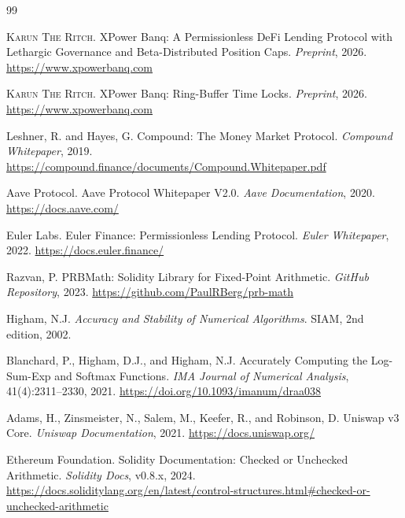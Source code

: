 \documentclass[10pt,a4paper,twocolumn]{article}
\theoremstyle{definition}
\theoremstyle{plain}
\theoremstyle{remark}
\begin{document}
\begin{thebibliography}{99}

\textsc{Karun The Ritch}.
\newblock XPower Banq: A Permissionless DeFi Lending Protocol with Lethargic Governance and Beta-Distributed Position Caps.
\newblock \emph{Preprint}, 2026.
\newblock \url{https://www.xpowerbanq.com}

\textsc{Karun The Ritch}.
\newblock XPower Banq: Ring-Buffer Time Locks.
\newblock \emph{Preprint}, 2026.
\newblock \url{https://www.xpowerbanq.com}

Leshner, R. and Hayes, G.
\newblock Compound: The Money Market Protocol.
\newblock \emph{Compound Whitepaper}, 2019.
\newblock \url{https://compound.finance/documents/Compound.Whitepaper.pdf}

Aave Protocol.
\newblock Aave Protocol Whitepaper V2.0.
\newblock \emph{Aave Documentation}, 2020.
\newblock \url{https://docs.aave.com/}

Euler Labs.
\newblock Euler Finance: Permissionless Lending Protocol.
\newblock \emph{Euler Whitepaper}, 2022.
\newblock \url{https://docs.euler.finance/}

Razvan, P.
\newblock PRBMath: Solidity Library for Fixed-Point Arithmetic.
\newblock \emph{GitHub Repository}, 2023.
\newblock \url{https://github.com/PaulRBerg/prb-math}

Higham, N.J.
\newblock \emph{Accuracy and Stability of Numerical Algorithms}.
\newblock SIAM, 2nd edition, 2002.

Blanchard, P., Higham, D.J., and Higham, N.J.
\newblock Accurately Computing the Log-Sum-Exp and Softmax Functions.
\newblock \emph{IMA Journal of Numerical Analysis}, 41(4):2311--2330, 2021.
\newblock \url{https://doi.org/10.1093/imanum/draa038}

Adams, H., Zinsmeister, N., Salem, M., Keefer, R., and Robinson, D.
\newblock Uniswap v3 Core.
\newblock \emph{Uniswap Documentation}, 2021.
\newblock \url{https://docs.uniswap.org/}

Ethereum Foundation.
\newblock Solidity Documentation: Checked or Unchecked Arithmetic.
\newblock \emph{Solidity Docs}, v0.8.x, 2024.
\newblock \url{https://docs.soliditylang.org/en/latest/control-structures.html#checked-or-unchecked-arithmetic}

\end{thebibliography}
\end{document}
